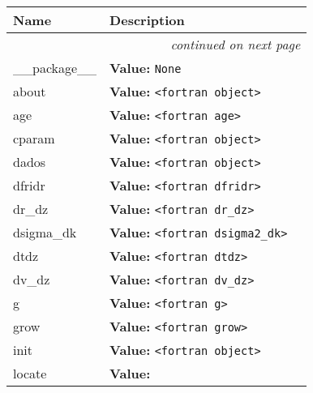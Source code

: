     \vspace{-1cm}
\hspace{\varindent}\begin{longtable}{|p{\varnamewidth}|p{\vardescrwidth}|l}
\cline{1-2}
\cline{1-2} \centering \textbf{Name} & \centering \textbf{Description}& \\
\cline{1-2}
\endhead\cline{1-2}\multicolumn{3}{r}{\small\textit{continued on next page}}\\\endfoot\cline{1-2}
\endlastfoot\raggedright \_\-\_\-p\-a\-c\-k\-a\-g\-e\-\_\-\_\- & \raggedright \textbf{Value:} 
{\tt None}&\\
\cline{1-2}
\raggedright a\-b\-o\-u\-t\- & \raggedright \textbf{Value:} 
{\tt {\textless}fortran object{\textgreater}}&\\
\cline{1-2}
\raggedright a\-g\-e\- & \raggedright \textbf{Value:} 
{\tt {\textless}fortran age{\textgreater}}&\\
\cline{1-2}
\raggedright c\-p\-a\-r\-a\-m\- & \raggedright \textbf{Value:} 
{\tt {\textless}fortran object{\textgreater}}&\\
\cline{1-2}
\raggedright d\-a\-d\-o\-s\- & \raggedright \textbf{Value:} 
{\tt {\textless}fortran object{\textgreater}}&\\
\cline{1-2}
\raggedright d\-f\-r\-i\-d\-r\- & \raggedright \textbf{Value:} 
{\tt {\textless}fortran dfridr{\textgreater}}&\\
\cline{1-2}
\raggedright d\-r\-\_\-d\-z\- & \raggedright \textbf{Value:} 
{\tt {\textless}fortran dr\_dz{\textgreater}}&\\
\cline{1-2}
\raggedright d\-s\-i\-g\-m\-a\-2\-\_\-d\-k\- & \raggedright \textbf{Value:} 
{\tt {\textless}fortran dsigma2\_dk{\textgreater}}&\\
\cline{1-2}
\raggedright d\-t\-d\-z\- & \raggedright \textbf{Value:} 
{\tt {\textless}fortran dtdz{\textgreater}}&\\
\cline{1-2}
\raggedright d\-v\-\_\-d\-z\- & \raggedright \textbf{Value:} 
{\tt {\textless}fortran dv\_dz{\textgreater}}&\\
\cline{1-2}
\raggedright g\- & \raggedright \textbf{Value:} 
{\tt {\textless}fortran g{\textgreater}}&\\
\cline{1-2}
\raggedright g\-r\-o\-w\- & \raggedright \textbf{Value:} 
{\tt {\textless}fortran grow{\textgreater}}&\\
\cline{1-2}
\raggedright i\-n\-i\-t\- & \raggedright \textbf{Value:} 
{\tt {\textless}fortran object{\textgreater}}&\\
\cline{1-2}
\raggedright l\-o\-c\-a\-t\-e\- & \raggedright \textbf{Value:} 

\end{longtable}
